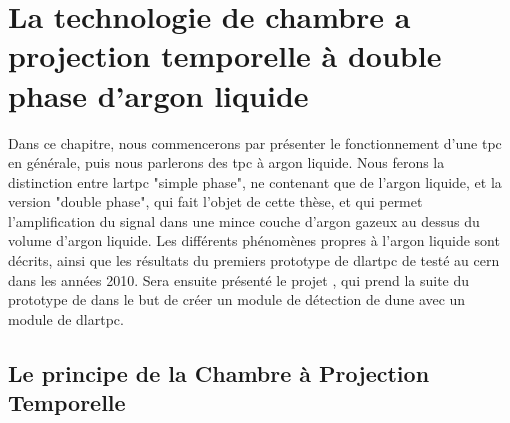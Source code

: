 
\chapter{La technologie de chambre a projection temporelle à double phase d'argon liquide}

  Dans ce chapitre, nous commencerons par présenter le fonctionnement d'une \gls{tpc} en générale, puis nous parlerons des \gls{tpc} à argon liquide. Nous ferons la distinction entre \gls{lartpc} "simple phase", ne contenant que de l'argon liquide, et la version "double phase", qui fait l'objet de cette thèse, et qui permet l'amplification du signal dans une mince couche d'argon gazeux au dessus du volume d'argon liquide. Les différents phénomènes propres à l'argon liquide sont décrits, ainsi que les résultats du premiers prototype de \gls{dlartpc} de \threeL{} testé au \gls{cern} dans les années 2010. Sera ensuite présenté le projet \protodp{}, qui prend la suite du prototype de \threeL{} dans le but de créer un module de détection de \gls{dune} avec un module de \gls{dlartpc}.
    
  \section{Le principe de la Chambre à Projection Temporelle}

